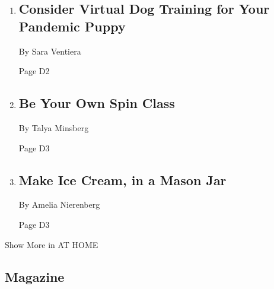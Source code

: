 \begin{enumerate}
\def\labelenumi{\arabic{enumi}.}
\item
  \href{/2020/05/01/well/consider-virtual-dog-training-for-your-pandemic-puppy.html}{}

  \hypertarget{consider-virtual-dog-training-for-your-pandemic-puppy}{%
  \subsection{Consider Virtual Dog Training for Your Pandemic
  Puppy}\label{consider-virtual-dog-training-for-your-pandemic-puppy}}

  By Sara Ventiera

  Page D2
\item
  \href{/2020/05/08/at-home/coronavirus-spin-from-home.html}{}

  \hypertarget{be-your-own-spin-class}{%
  \subsection{Be Your Own Spin Class}\label{be-your-own-spin-class}}

  By Talya Minsberg

  Page D3
\item
  \href{/2020/05/09/at-home/virus-make-ice-cream-in-a-mason-jar.html}{}

  \hypertarget{make-ice-cream-in-a-mason-jar}{%
  \subsection{Make Ice Cream, in a Mason
  Jar}\label{make-ice-cream-in-a-mason-jar}}

  By Amelia Nierenberg

  Page D3
\end{enumerate}

Show More in AT HOME

\hypertarget{magazine}{%
\subsection{Magazine}\label{magazine}}

